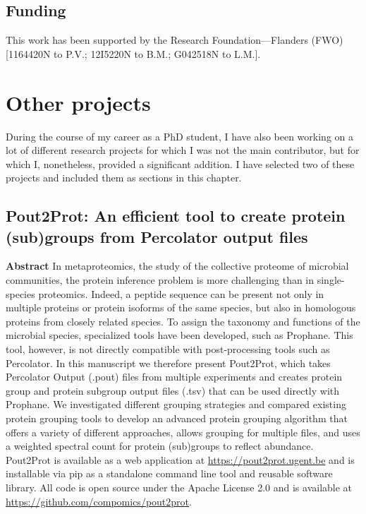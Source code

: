 \hypertarget{funding-1}{%
\section{Funding}\label{funding-1}}

This work has been supported by the Research Foundation---Flanders (FWO)
{[}1164420N to P.V.; 12I5220N to B.M.; G042518N to L.M.{]}.

\hypertarget{other-projects-1}{%
\chapter{Other projects}\label{other-projects-1}}


During the course of my career as a PhD student, I have also been
working on a lot of different research projects for which I was not the
main contributor, but for which I, nonetheless, provided a significant
addition. I have selected two of these projects and included them as
sections in this chapter.

\hypertarget{pout2prot-an-efficient-tool-to-create-protein-subgroups-from-percolator-output-files}{%
\section{Pout2Prot: An efficient tool to create protein (sub)groups from
Percolator output
files}\label{pout2prot-an-efficient-tool-to-create-protein-subgroups-from-percolator-output-files}}

\textbf{Abstract} In metaproteomics, the study of the collective
proteome of microbial communities, the protein inference problem is more
challenging than in single-species proteomics. Indeed, a peptide
sequence can be present not only in multiple proteins or protein
isoforms of the same species, but also in homologous proteins from
closely related species. To assign the taxonomy and functions of the
microbial species, specialized tools have been developed, such as
Prophane. This tool, however, is not directly compatible with
post-processing tools such as Percolator. In this manuscript we
therefore present Pout2Prot, which takes Percolator Output (.pout) files
from multiple experiments and creates protein group and protein subgroup
output files (.tsv) that can be used directly with Prophane. We
investigated different grouping strategies and compared existing protein
grouping tools to develop an advanced protein grouping algorithm that
offers a variety of different approaches, allows grouping for multiple
files, and uses a weighted spectral count for protein (sub)groups to
reflect abundance. Pout2Prot is available as a web application at
\url{https://pout2prot.ugent.be} and is installable via pip as a
standalone command line tool and reusable software library. All code is
open source under the Apache License 2.0 and is available at
\url{https://github.com/compomics/pout2prot}.

